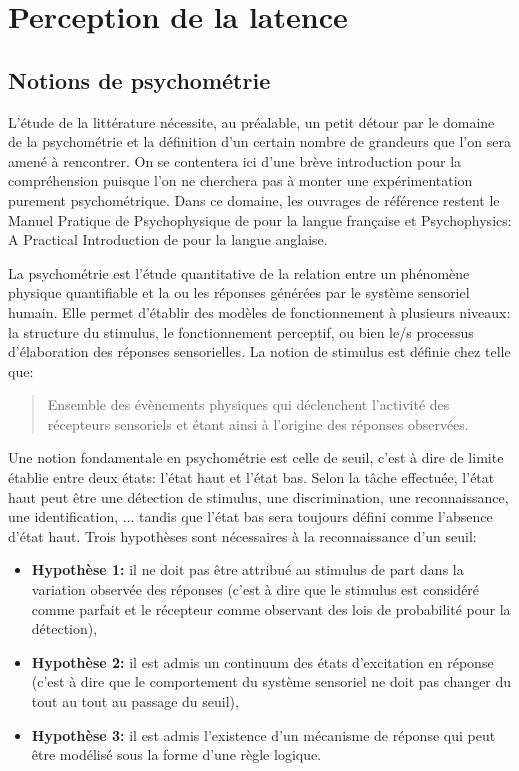 	\section{Perception de la latence}
	\subsection{Notions de psychométrie}
	\par L'étude de la littérature nécessite, au préalable, un petit détour par le domaine de la psychométrie et la définition d'un certain nombre de grandeurs que l'on sera amené à rencontrer. On se contentera ici d'une brève introduction pour la compréhension puisque l'on ne cherchera pas à monter une expérimentation purement psychométrique. Dans ce domaine, les ouvrages de référence restent le Manuel Pratique de Psychophysique de \cite{bonnet_manuel_1986} pour la langue française et Psychophysics: A Practical Introduction de \cite{kingdom_psychophysics:_2010} pour la langue anglaise.
	
	\par La psychométrie est l'étude quantitative de la relation entre un phénomène physique quantifiable et la ou les réponses générées par le système sensoriel humain. Elle permet d'établir des modèles de fonctionnement à plusieurs niveaux: la structure du stimulus, le fonctionnement perceptif, ou bien le/s processus d'élaboration des réponses sensorielles. La notion de stimulus est  définie chez \citep{bonnet_manuel_1986} telle que:
	\begin{quote}
		Ensemble des évènements physiques qui déclenchent l'activité des récepteurs sensoriels et étant ainsi à l'origine des réponses observées.
	\end{quote}
	
	\par Une notion fondamentale en psychométrie est celle de seuil, c'est à dire de limite établie entre deux états: l'état haut et l'état bas. Selon la tâche effectuée, l'état haut peut être une détection de stimulus, une discrimination, une reconnaissance, une identification, ... tandis que l'état bas sera toujours défini comme l'absence d'état haut. Trois hypothèses sont nécessaires à la reconnaissance d'un seuil:
	\begin{itemize}
		\item \textbf{Hypothèse 1:} il ne doit pas être attribué au stimulus de part dans la variation observée des réponses (c'est à dire que le stimulus est considéré comme parfait et le récepteur comme observant des lois de probabilité pour la détection),
		\item \textbf{Hypothèse 2:} il est admis un continuum des états d'excitation en réponse (c'est à dire que le comportement du système sensoriel ne doit pas changer du tout au tout au passage du seuil),
		\item \textbf{Hypothèse 3:} il est admis l'existence d'un mécanisme de réponse qui peut être modélisé sous la forme d'une règle logique.
	\end{itemize}		
	
